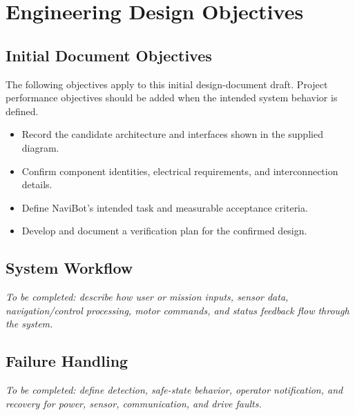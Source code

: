 \section{Engineering Design Objectives}

\subsection{Initial Document Objectives}
The following objectives apply to this initial design-document draft. Project performance objectives should be added when the intended system behavior is defined.
\begin{itemize}
    \item Record the candidate architecture and interfaces shown in the supplied diagram.
    \item Confirm component identities, electrical requirements, and interconnection details.
    \item Define NaviBot's intended task and measurable acceptance criteria.
    \item Develop and document a verification plan for the confirmed design.
\end{itemize}

\subsection{System Workflow}
\textit{To be completed: describe how user or mission inputs, sensor data, navigation/control processing, motor commands, and status feedback flow through the system.}

\subsection{Failure Handling}
\textit{To be completed: define detection, safe-state behavior, operator notification, and recovery for power, sensor, communication, and drive faults.}
